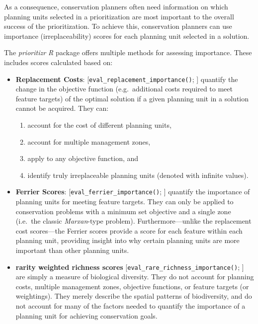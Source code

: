 \documentclass[
  12pt,
]{book}
\providecommand{\tightlist}{%
  \setlength{\itemsep}{0pt}\setlength{\parskip}{0pt}}
\begin{document}
As a consequence, conservation planners often need information on which planning units selected in a prioritization are most important to the overall success of the prioritization. To achieve this, conservation planners can use importance (irreplaceability) scores for each planning unit selected in a solution.

The \emph{prioritizr R} package offers multiple methods for assessing importance. These includes scores calculated based on:

\begin{itemize}
\item
  \textbf{Replacement Costs}: {[}\texttt{eval\_replacement\_importance()}; \citet{r31}{]} quantify the change in the objective function (e.g.~additional costs required to meet feature targets) of the optimal solution if a given planning unit in a solution cannot be acquired. They can:

  \begin{enumerate}
  \def\labelenumi{\arabic{enumi}.}
  \tightlist
  \item
    account for the cost of different planning units,\\
  \item
    account for multiple management zones,
  \item
    apply to any objective function, and
  \item
    identify truly irreplaceable planning units (denoted with infinite values).
  \end{enumerate}
\item
  \textbf{Ferrier Scores}: {[}\texttt{eval\_ferrier\_importance()}; \citet{r34}{]} quantify the importance of planning units for meeting feature targets. They can only be applied to conservation problems with a minimum set objective and a single zone (i.e.~the classic \emph{Marxan}-type problem). Furthermore---unlike the replacement cost scores---the Ferrier scores provide a score for each feature within each planning unit, providing insight into why certain planning units are more important than other planning units.
\item
  \textbf{rarity weighted richness scores} {[}\texttt{eval\_rare\_richness\_importance()}; \citet{r33}{]} are simply a measure of biological diversity. They do not account for planning costs, multiple management zones, objective functions, or feature targets (or weightings). They merely describe the spatial patterns of biodiversity, and do not account for many of the factors needed to quantify the importance of a planning unit for achieving conservation goals.
\end{itemize}
\end{document}
